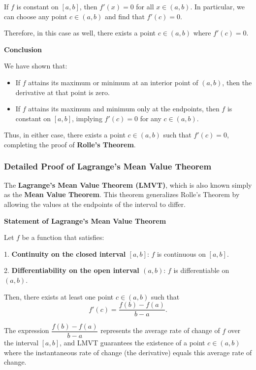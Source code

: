 \documentclass[a4paper,12pt]{book}
\begin{document}
If \( f \) is constant on \([a, b]\), then \( f'(x) = 0 \) for all \( x \in (a, b) \). In particular, we can choose any point \( c \in (a, b) \) and find that \( f'(c) = 0 \).

Therefore, in this case as well, there exists a point \( c \in (a, b) \) where \( f'(c) = 0 \).

\noindent\hrulefill

\textbf{Conclusion}

We have shown that:

\begin{itemize}
	\item 
	If \( f \) attains its maximum or minimum at an interior point of \((a, b)\), then the derivative at that point is zero.
	\item 
	If \( f \) attains its maximum and minimum only at the endpoints, then \( f \) is constant on \([a, b]\), implying \( f'(c) = 0 \) for any \( c \in (a, b) \).
\end{itemize}

Thus, in either case, there exists a point \( c \in (a, b) \) such that \( f'(c) = 0 \), completing the proof of \textbf{Rolle's Theorem}.

\subsubsection{Detailed Proof of Lagrange’s Mean Value Theorem}

The \textbf{Lagrange's Mean Value Theorem (LMVT)}, which is also known simply as the \textbf{Mean Value Theorem}. This theorem generalizes Rolle’s Theorem by allowing the values at the endpoints of the interval to differ.

\textbf{Statement of Lagrange’s Mean Value Theorem}

Let \( f \) be a function that satisfies:

1. \textbf{Continuity on the closed interval \([a, b]\)}: \( f \) is continuous on \([a, b]\).

2. \textbf{Differentiability on the open interval \((a, b)\)}: \( f \) is differentiable on \((a, b)\).

Then, there exists at least one point \( c \in (a, b) \) such that
\[
f'(c) = \dfrac{f(b) - f(a)}{b - a}.
\]

The expression \(\dfrac{f(b) - f(a)}{b - a}\) represents the average rate of change of \( f \) over the interval \([a, b]\), and LMVT guarantees the existence of a point \( c \in (a, b)\) where the instantaneous rate of change (the derivative) equals this average rate of change.
\end{document}
